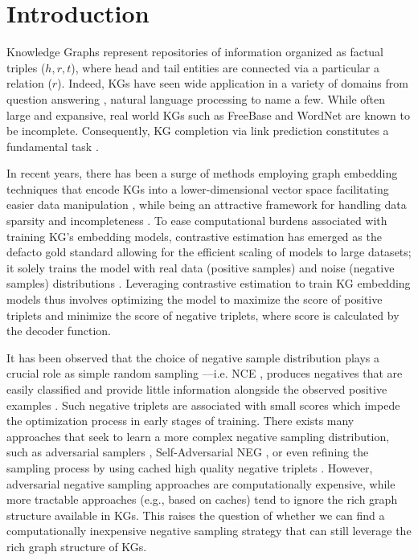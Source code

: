 \section{Introduction}

Knowledge Graphs represent repositories of information organized as factual triples ($h,r,t$), where head and tail entities are connected via a particular a relation ($r$). Indeed, KGs have seen wide application in a variety of domains from question answering \cite{yao2014information, malinowski2014multi, hao2017end}, natural language processing \cite{berant2013semantic, yu2014improving, yang2019leveraging} to name a few. While often large and expansive, real world KGs such as FreeBase \cite{bollacker2008freebase} and WordNet \cite{miller1995wordnet} are known to be incomplete. Consequently, KG completion via link prediction constitutes a fundamental task \cite{sun2019rotate, kotnis2017analysis, angeli2013philosophers}.

In recent years, there has been a surge of methods employing graph embedding techniques that encode KGs into a lower-dimensional vector space facilitating easier data manipulation \cite{zhang2019nscaching}, while being an attractive framework for handling data sparsity and incompleteness \cite{wang2018incorporating}. To ease computational burdens associated with training KG's embedding models, contrastive estimation \cite{gutmann2010noise} has emerged as the defacto gold standard allowing for the efficient scaling of models to large datasets; it solely trains the model with real data (positive samples) and noise (negative samples) distributions \cite{ma2018noise}. Leveraging contrastive estimation to train KG embedding models thus involves optimizing the model to maximize the score of positive triplets and minimize the score of negative triplets, where score is calculated by the decoder function. %

It has been observed that the choice of negative sample distribution plays a crucial role as simple random sampling ---i.e. NCE \cite{gutmann2010noise}, produces negatives that are easily classified and provide little information alongside the observed positive examples \cite{zhang2019nscaching, wang2018incorporating}. Such negative triplets are associated with small scores which impede the optimization process in early stages of training. 
There exists many approaches that seek to learn a more complex negative sampling distribution, such as adversarial samplers \cite{cai2017kbgan, bose2018adversarial}, Self-Adversarial NEG \cite{sun2019rotate}, or even refining the sampling process by using cached high quality negative triplets \cite{zhang2019nscaching}. However, adversarial negative sampling approaches are computationally expensive, while more tractable approaches (e.g., based on caches) tend to ignore the rich graph structure available in KGs. This raises the question of whether we can find a computationally inexpensive negative sampling strategy that can still leverage the rich graph structure of KGs.

